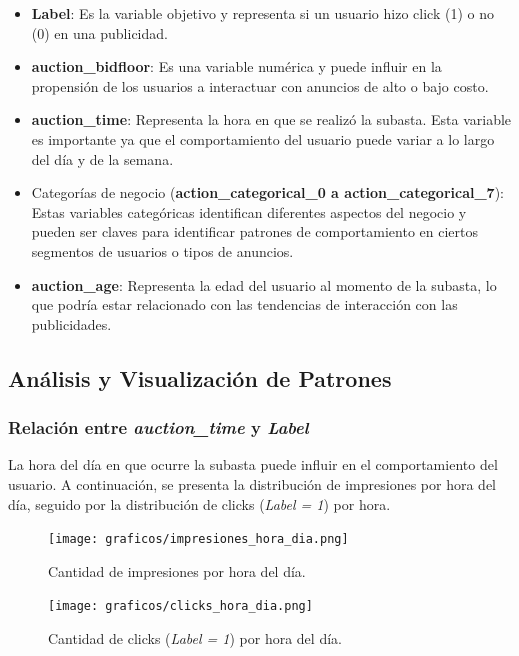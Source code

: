 \documentclass[a4paper,11pt]{article}
\begin{document}
\begin{itemize}
    \item \textbf{Label}: Es la variable objetivo y representa si un usuario hizo click (1) o no (0) en una publicidad.
    
    \item \textbf{auction\_bidfloor}: Es una variable numérica y puede influir en la propensión de los usuarios a interactuar con anuncios de alto o bajo costo.
    
    \item \textbf{auction\_time}: Representa la hora en que se realizó la subasta. Esta variable es importante ya que el comportamiento del usuario puede variar a lo largo del día y de la semana.
    
    \item Categorías de negocio (\textbf{action\_categorical\_0 a action\_categorical\_7}): Estas variables categóricas identifican diferentes aspectos del negocio y pueden ser claves para identificar patrones de comportamiento en ciertos segmentos de usuarios o tipos de anuncios.
    
    \item \textbf{auction\_age}: Representa la edad del usuario al momento de la subasta, lo que podría estar relacionado con las tendencias de interacción con las publicidades.
\end{itemize}

\subsection{Análisis y Visualización de Patrones}

\subsubsection{Relación entre \textit{auction\_time} y \textit{Label}}

La hora del día en que ocurre la subasta puede influir en el comportamiento del usuario. A continuación, se presenta la distribución de impresiones por hora del día, seguido por la distribución de clicks (\textit{Label = 1}) por hora.

\begin{figure}[H]
    \centering
    \begin{minipage}{0.48\textwidth}
        \centering
        \texttt{[image: graficos/impresiones\_hora\_dia.png]}
        \caption{Cantidad de impresiones por hora del día.}
    \end{minipage}
    \hfill
    \begin{minipage}{0.48\textwidth}
        \centering
        \texttt{[image: graficos/clicks\_hora\_dia.png]}
        \caption{Cantidad de clicks (\textit{Label = 1}) por hora del día.}
    \end{minipage}
\end{figure}
\end{document}
